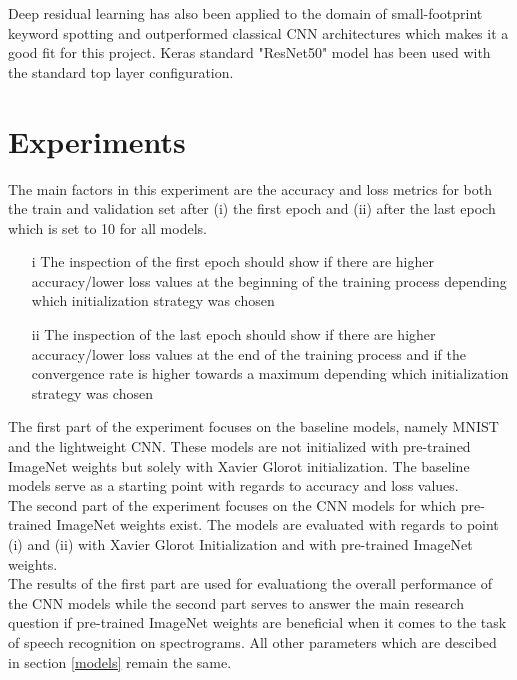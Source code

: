 \documentclass{article}
\theoremstyle{definition}
\theoremstyle{remark}
\begin{document}
Deep residual learning has also been applied to the domain of small-footprint keyword spotting and outperformed classical CNN architectures \cite{tang2018deep} which makes it a good fit for this project. Keras standard "ResNet50" model has been used with the standard top layer configuration.




\section{Experiments}

The main factors in this experiment are the accuracy and loss metrics for both the train and validation set after (i) the first epoch and (ii) after the last epoch which is set to 10 for all models.\\

\begin{enumerate}
	\item[i] The inspection of the first epoch should show if there are higher accuracy/lower loss values at the beginning of the training process depending which initialization strategy was chosen
	\item[ii] The inspection of the last epoch should show if there are higher accuracy/lower loss values at the end of the training process and if the convergence rate is higher towards a maximum depending which initialization strategy was chosen
\end{enumerate}

The first part of the experiment focuses on the baseline models, namely MNIST and the lightweight CNN. These models are not initialized with pre-trained ImageNet weights but solely with Xavier Glorot initialization. The baseline models serve as a starting point with regards to accuracy and loss values.\\

The second part of the experiment focuses on the CNN models for which pre-trained ImageNet weights exist. The models are evaluated with regards to point (i) and (ii) with Xavier Glorot Initialization and with pre-trained ImageNet weights.\\

The results of the first part are used for evaluationg the overall performance of the CNN models while the second part serves to answer the main research question if pre-trained ImageNet weights are beneficial when it comes to the task of speech recognition on spectrograms. All other parameters which are descibed in section \ref{models} remain the same.
\end{document}
